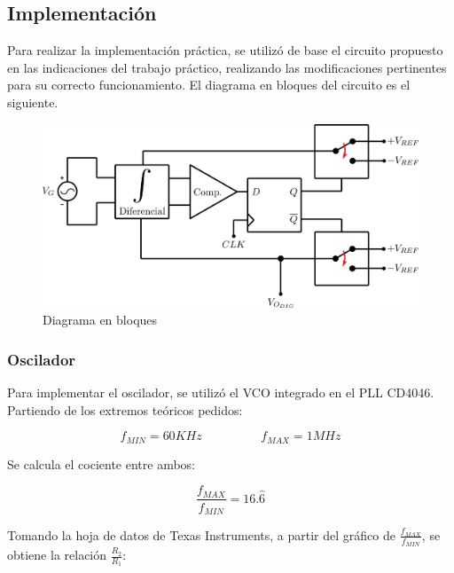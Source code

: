 \documentclass[assd_tp3_main.tex]{subfiles}
\begin{document}
\subsection{Implementación}

Para realizar la implementación práctica, se utilizó de base el circuito propuesto en las indicaciones del trabajo práctico, realizando las modificaciones pertinentes para su correcto funcionamiento. El diagrama en bloques del circuito es el siguiente.

\begin{figure}[!ht]
\begin{centering}
\includegraphics[scale=0.5]{images/ej5/Diagrama.png}
\par\end{centering}
\caption{Diagrama en bloques}
\end{figure}

\subsubsection{Oscilador}

Para implementar el oscilador, se utilizó el VCO integrado en el PLL CD4046. Partiendo de los extremos teóricos pedidos:

\[
f_{MIN} = 60KHz \hspace{2cm} f_{MAX} = 1MHz
\]

Se calcula el cociente entre ambos:

\[
\frac{f_{MAX}}{f_{MIN}} = 16.\hat{6}
\] 

Tomando la hoja de datos de Texas Instruments, a partir del gráfico de $\frac{f_{MAX}}{f_{MIN}}$, se obtiene la relación $\frac{R_2}{R_1}$:
\end{document}
